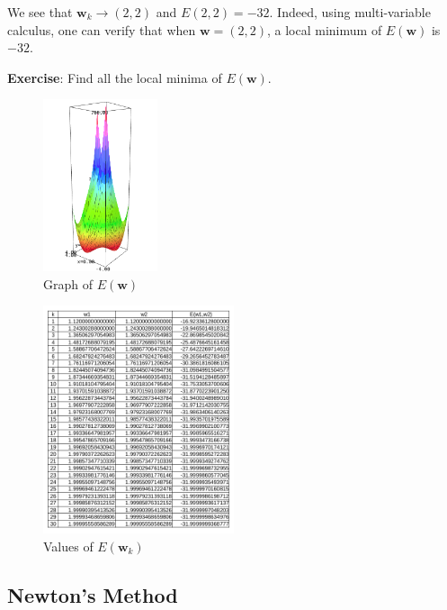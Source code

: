 \documentclass[
]{article}
\begin{document}
We see that \({\boldsymbol{w}}_k \rightarrow (2,2)\) and \(E(2,2)=-32\).
Indeed, using multi-variable calculus, one can verify that when
\({\boldsymbol{w}}=(2,2)\), a local minimum of \(E({\boldsymbol{w}})\)
is \(-32\).

\textbf{Exercise}: Find all the local minima of \(E({\boldsymbol{w}})\).

\begin{figure}
\hypertarget{fig:des}{%
\centering
\includegraphics[width=0.3\textwidth,height=\textheight]{descent.png}
\caption{Graph of \(E({\boldsymbol{w}})\)}\label{fig:des}
}
\end{figure}

\begin{figure}
\hypertarget{fig:tab}{%
\centering
\includegraphics[width=0.5\textwidth,height=\textheight]{table.png}
\caption{Values of \(E({\boldsymbol{w}}_k)\)}\label{fig:tab}
}
\end{figure}

\hypertarget{newtons-method}{%
\subsection{Newton's Method}\label{newtons-method}}
\end{document}
